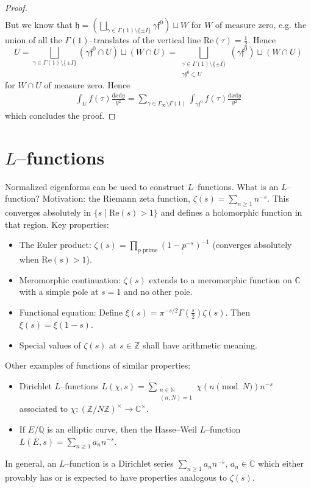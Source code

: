\documentclass{article}
\theoremstyle{definition}
\begin{document}
\begin{proof}
\begin{align*}
    \end{align*}
    But we know that $\mathfrak{h} = \left(\bigsqcup_{\gamma \in \Gamma(1)\setminus \{\pm  I\}} \gamma \mathfrak{f}^0\right) \sqcup W$ for $W$ of measure zero, e.g. the union of all the $\Gamma(1)$--translates of the vertical line $\text{Re}(\tau)=\frac{1}{2}$. Hence $$U = \bigsqcup_{\gamma \in \Gamma(1)\setminus \{\pm I\}}(\gamma \mathfrak{f}^0 \cap U) \sqcup (W \cap U) = \bigsqcup_{\substack{\gamma \in \Gamma(1)\setminus \{\pm I\}\\ \gamma \mathfrak{f}^0 \subset U}} (\gamma \mathfrak{f}^0) \sqcup (W \cap U)$$
    for $W \cap U$ of measure zero. Hence 
    \begin{align*}
        \int_{U}^{} f(\tau)\frac{\mathrm{d}x\mathrm{d}y}{y^2} = \sum_{\gamma \in \Gamma_{\infty}\setminus \Gamma(1)}^{} \int_{\gamma \mathfrak{f}^0}^{} f(\tau) \frac{\mathrm{d}x\mathrm{d}y}{y^2}
    \end{align*}
    which concludes the proof.
\end{proof}

\section{$L$--functions}

Normalized eigenforms can be used to construct $L$--functions. What is an $L$--function? Motivation: the Riemann zeta function, $\zeta(s) = \sum_{n \ge 1}^{} n^{-s}$. This converges absolutely in $\{s \mid \text{Re}(s)>1\}$ and defines a holomorphic function in that region. Key properties:
\begin{itemize}
    \item The Euler product: $\zeta(s) = \prod_{p \text{ prime}}^{} (1-p^{-s})^{-1}$ (converges absolutely when $\text{Re}(s)>1$).
    \item Meromorphic continuation: $\zeta(s)$ extends to a meromorphic function on $\mathbb{C}$ with a simple pole at $s=1$ and no other pole.
    \item Functional equation: Define $\xi(s) = \pi^{-s/2}\Gamma\left(\frac{s}{2}\right)\zeta(s)$. Then $\xi(s) = \xi(1-s)$.
    \item Special values of $\zeta(s)$ at $s \in \mathbb{Z}$ shall have arithmetic meaning.
\end{itemize}
Other examples of functions of similar properties: 
\begin{itemize}
    \item Dirichlet $L$--functions $L(\chi, s) = \sum_{\substack{n \in \mathbb{N} \\ (n,N)=1}}^{} \chi(n \pmod{N})n^{-s}$ associated to $\chi : (\mathbb{Z}/N\mathbb{Z})^\times \to \mathbb{C}^\times$.
    \item If $E/\mathbb{Q}$ is an elliptic curve, then the Hasse--Weil $L$--function $L(E,s) = \sum_{n\ge 1}^{} a_n n^{-s}$.
\end{itemize}
In general, an $L$--function is a Dirichlet series $\sum_{n\ge 1}^{} a_n n^{-s}$, $a_n \in \mathbb{C}$ which either provably has or is expected to have properties analogous to $\zeta(s)$.
\end{document}

